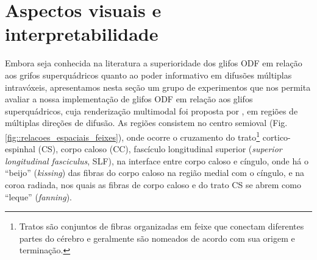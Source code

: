 \section{Aspectos visuais e interpretabilidade}
\label{sec::aspectos_visuais_e_interpretabilidade}



Embora seja conhecida na literatura a superioridade dos glifos ODF em relação aos grifos superquádricos quanto ao poder informativo em difusões múltiplas intravóxeis, apresentamos nesta seção um grupo de experimentos que nos permita avaliar a nossa implementação de glifos ODF em relação aos glifos superquádricos, cuja renderização multimodal foi proposta por , em regiões de múltiplas direções de difusão. As regiões consistem no centro semioval (Fig. \ref{fig::relacoes_espaciais_feixes}), onde ocorre o cruzamento do trato\footnote{Tratos são conjuntos de fibras organizadas em feixe que conectam diferentes partes do cérebro e geralmente são nomeados de acordo com sua origem e terminação.} cortico-espinhal (CS), corpo caloso (CC), fascículo longitudinal superior (\textit{superior longitudinal fasciculus}, SLF), na interface entre corpo caloso e cíngulo, onde há o ``beijo'' (\textit{kissing}) das fibras do corpo caloso na região medial com o cíngulo, e na coroa radiada, nos quais as fibras de corpo caloso e do trato CS se abrem como ``leque'' (\textit{fanning}).


